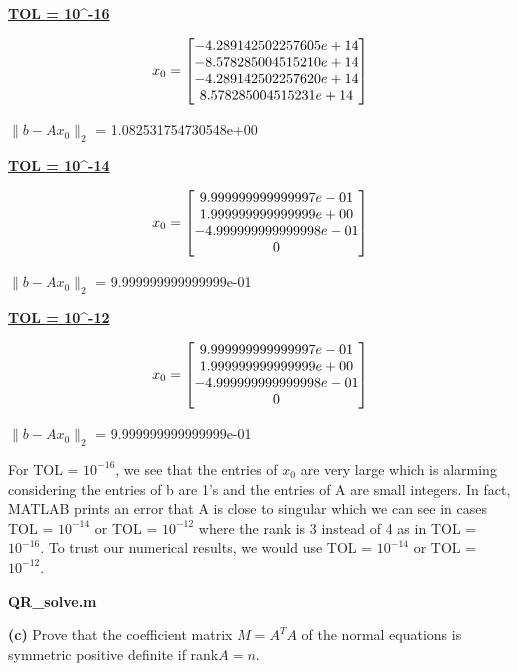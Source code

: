 \documentclass[final,12pt,reqno]{amsart}
\begin{document}
\textbf{\underline{TOL = 10^{-16}}}

\[
x_0 =
\left[\begin{array}{@{}*{1}{c}@{}}
    -4.289142502257605e+14\\
    -8.578285004515210e+14\\
    -4.289142502257620e+14\\
     8.578285004515231e+14
  \end{array} \right]
\]

$\|b-Ax_0\|_2$ = 1.082531754730548e+00

\textbf{\underline{TOL = 10^{-14}}}

\[
x_0 =
\left[\begin{array}{@{}*{1}{c}@{}}
     9.999999999999997e-01\\
     1.999999999999999e+00\\
    -4.999999999999998e-01\\
                         0
  \end{array} \right]
\]

$\|b-Ax_0\|_2$ = 9.999999999999999e-01

\textbf{\underline{TOL = 10^{-12}}}

\[
x_0 =
\left[\begin{array}{@{}*{1}{c}@{}}
     9.999999999999997e-01\\
     1.999999999999999e+00\\
    -4.999999999999998e-01\\
                         0
  \end{array} \right]
\]

$\|b-Ax_0\|_2$ = 9.999999999999999e-01

For TOL = $10^{-16}$, we see that the entries of $x_0$ are very large which is alarming considering the entries of b are 1's and the entries of A are small integers. In fact, MATLAB prints an error that A is close to singular which we can see in cases TOL = $10^{-14}$ or TOL = $10^{-12}$ where the rank is 3 instead of 4 as in TOL = $10^{-16}$. To trust our numerical results, we would use TOL = $10^{-14}$ or TOL = $10^{-12}$.

\newpage

\textbf{QR\_solve.m}


\newpage

\textbf{(c)} Prove that the coefficient matrix $M = A^TA$ of the normal equations is symmetric positive definite if rank$A = n$.
\end{document}
